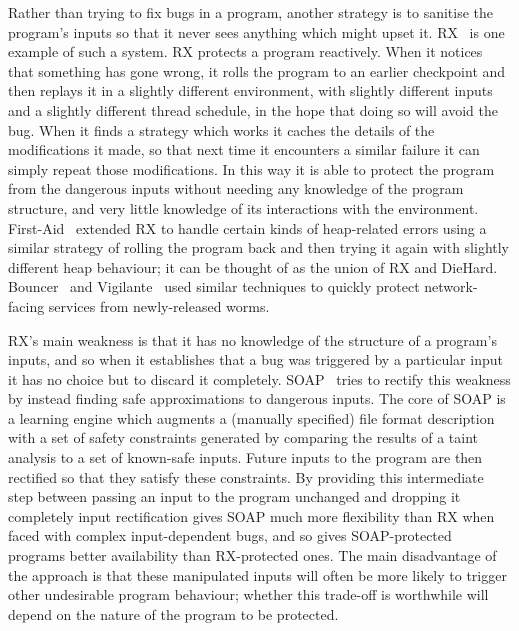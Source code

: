 Rather than trying to fix bugs in a program, another strategy is to
sanitise the program's inputs so that it never sees anything which
might upset it.  RX~\cite{Qin2007} is one example of such a system.  RX
protects a program reactively.  When it notices that something has
gone wrong, it rolls the program to an earlier checkpoint and then
replays it in a slightly different environment, with slightly
different inputs and a slightly different thread schedule, in the hope
that doing so will avoid the bug.  When it finds a strategy which
works it caches the details of the modifications it made, so that next
time it encounters a similar failure it can simply repeat those
modifications.  In this way it is able to protect the program from the
dangerous inputs without needing any knowledge of the program
structure, and very little knowledge of its interactions with the
environment.  First-Aid~\cite{Gao2009} extended RX to handle certain
kinds of heap-related errors using a similar strategy of rolling the
program back and then trying it again with slightly different heap
behaviour; it can be thought of as the union of RX and DieHard.
Bouncer~\cite{Costa2007} and Vigilante~\cite{Costa2008} used similar
techniques to quickly protect network-facing services from
newly-released worms.

RX's main weakness is that it has no knowledge of the structure of a
program's inputs, and so when it establishes that a bug was triggered
by a particular input it has no choice but to discard it completely.
SOAP~\cite{Long2012} tries to rectify this weakness by instead finding
safe approximations to dangerous inputs.  The core of SOAP is a
learning engine which augments a (manually specified) file format
description with a set of safety constraints generated by comparing
the results of a taint analysis to a set of known-safe inputs.  Future
inputs to the program are then rectified so that they satisfy these
constraints.  By providing this intermediate step between passing an
input to the program unchanged and dropping it completely input
rectification gives SOAP much more flexibility than RX when faced with
complex input-dependent bugs, and so gives SOAP-protected programs
better availability than RX-protected ones.  The main disadvantage of
the approach is that these manipulated inputs will often be more
likely to trigger other undesirable program behaviour; whether this
trade-off is worthwhile will depend on the nature of the program to be
protected.

